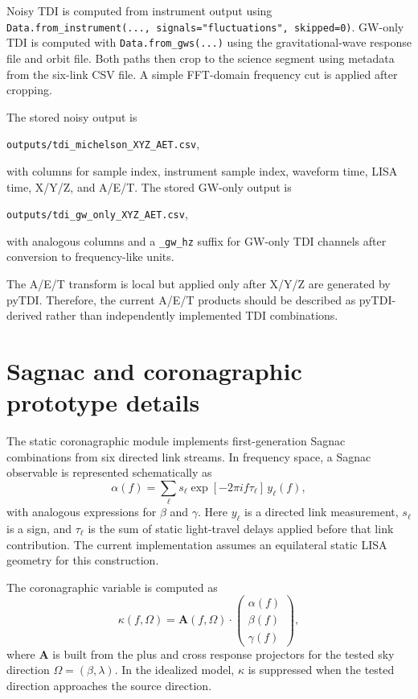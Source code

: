 \documentclass[%
 reprint,
 amsmath,amssymb,
 aps,
 prd,
]{revtex4-2}
\begin{document}
Noisy TDI is computed from instrument output using \texttt{Data.from\_instrument(..., signals="fluctuations", skipped=0)}.  GW-only TDI is computed with \texttt{Data.from\_gws(...)} using the gravitational-wave response file and orbit file.  Both paths then crop to the science segment using metadata from the six-link CSV file.  A simple FFT-domain frequency cut is applied after cropping.

The stored noisy output is
\begin{center}
\texttt{outputs/tdi\_michelson\_XYZ\_AET.csv},
\end{center}
with columns for sample index, instrument sample index, waveform time, LISA time, X/Y/Z, and A/E/T.  The stored GW-only output is
\begin{center}
\texttt{outputs/tdi\_gw\_only\_XYZ\_AET.csv},
\end{center}
with analogous columns and a \texttt{\_gw\_hz} suffix for GW-only TDI channels after conversion to frequency-like units.

The A/E/T transform is local but applied only after X/Y/Z are generated by pyTDI.  Therefore, the current A/E/T products should be described as pyTDI-derived rather than independently implemented TDI combinations.

\section{Sagnac and coronagraphic prototype details}
\label{app:sagnac_details}

The static coronagraphic module implements first-generation Sagnac combinations from six directed link streams.  In frequency space, a Sagnac observable is represented schematically as
\begin{equation}
\alpha(f) = \sum_{\ell} s_{\ell}\exp[-2\pi i f\tau_{\ell}]\,y_{\ell}(f),
\label{eq:sagnac_schematic}
\end{equation}
with analogous expressions for $\beta$ and $\gamma$.  Here $y_{\ell}$ is a directed link measurement, $s_{\ell}$ is a sign, and $\tau_{\ell}$ is the sum of static light-travel delays applied before that link contribution.  The current implementation assumes an equilateral static LISA geometry for this construction.

The coronagraphic variable is computed as
\begin{equation}
\kappa(f,\Omega) = \mathbf A(f,\Omega)\cdot
\begin{pmatrix}
\alpha(f)\\
\beta(f)\\
\gamma(f)
\end{pmatrix},
\label{eq:kappa}
\end{equation}
where $\mathbf A$ is built from the plus and cross response projectors for the tested sky direction $\Omega=(\beta,\lambda)$.  In the idealized model, $\kappa$ is suppressed when the tested direction approaches the source direction.
\end{document}
